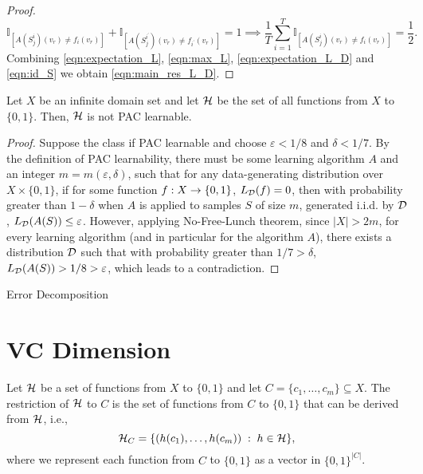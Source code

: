 \documentclass[11pt,a4paper]{article}
\begin{document}
\begin{proof}
\begin{equation}\label{eqn:id_S}
    \mathbb{I}_{[A(S_j^i)(v_r)\neq f_i(v_r)]} + \mathbb{I}_{[A(S_j^{i^\prime})(v_r)\neq f_{i^\prime}(v_r)]} = 1 \implies \dfrac{1}{T}\sum_{i=1}^T \mathbb{I}_{[A(S_j^i)(v_r)\neq f_i(v_r)]} = \dfrac{1}{2}.
\end{equation}
Combining \eqref{eqn:expectation_L}, \eqref{eqn:max_L}, \eqref{eqn:expectation_L_D} and \eqref{eqn:id_S} we obtain \eqref{eqn:main_res_L_D}.  
\end{proof}

\begin{corollary}
    Let $X$ be an infinite domain set and let $\h$ be the set of all functions from $X$ to $\{0,1\}$. Then, $\h$ is not PAC learnable.
\end{corollary}

\begin{proof}
    Suppose the class if PAC learnable and choose $\varepsilon<1/8$ and $\delta<1/7$. By the definition of PAC learnability, there must be some learning algorithm $A$ and an integer $m = m(\varepsilon, \delta)$, such that for any data-generating distribution over $X\times \{0,1\}$, if for some function $f:X\rightarrow \{0,1\}$, $L_{\mathcal{D}}(f) = 0$, then with probability greater than $1-\delta$ when $A$ is applied to samples $S$ of size $m$, generated i.i.d. by $\mathcal{D}$, $L_{\mathcal{D}}(A(S))\le \varepsilon$. However, applying No-Free-Lunch theorem, since $|X|>2m$, for every learning algorithm (and in particular for the algorithm $A$), there exists a distribution $\mathcal{D}$ such that with probability greater than $1/7>\delta$, $L_{\mathcal{D}}(A(S))>1/8>\varepsilon$, which leads to a contradiction.
\end{proof}

Error Decomposition

\section{VC Dimension}

\begin{definition}[Restriction of $\h$ to $C$] 
Let $\h$ be a set of functions from $X$ to $\{0,1\}$ and let $C = \{c_1,\ldots,c_m\}\subseteq X$. The restriction of $\h$ to $C$ is the set of functions from $C$ to $\{0,1\}$ that can be derived from $\h$, i.e.,
\begin{equation*}
    \mathcal{H}_C = \{(h(c_1),\ldots,h(c_m))\;:\; h\in \mathcal{H}\},
\end{equation*}
where we represent each function from $C$ to $\{0,1\}$ as a vector in $\{0,1\}^{|C|}$.
\end{definition}
\end{document}
